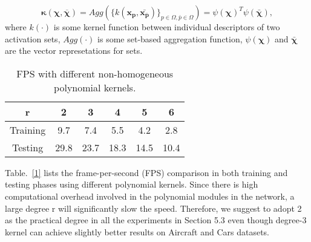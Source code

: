 \documentclass{article}
\begin{document}
\begin{equation} \label{1}
\boldsymbol{\kappa(\chi,\overline{\chi})}=Agg(\{k(\boldsymbol{x_p,\bar{x_{\overline p}}})\}_{p\in\Omega,\bar p\in\Omega})=\psi(\boldsymbol{\chi})^T\psi(\bar{\boldsymbol{\chi}}),
\end{equation}
where $k(\cdot)$ is some kernel function between individual descriptors of two activation sets, $Agg(\cdot)$ is some set-based aggregation function, $\psi(\boldsymbol{\chi})$ and $\bar{\boldsymbol{\chi}}$ are the vector represetations for sets.
\par
\begin{table}[htbp]
\centering
\begin{tabular}{|c|c|c|c|c|c|}
\hline
r & 2 & 3 & 4 & 5 & 6 \\
\hline
Training & 9.7 & 7.4 & 5.5 & 4.2 & 2.8 \\
\hline
Testing & 29.8 & 23.7 & 18.3 & 14.5 & 10.4 \\
\hline
\end{tabular}
\caption{FPS with different non-homogeneous polynomial kernels.}
\label{tab1}
\end{table}
Table.~\textcolor{red}{\ref{1}} lists the frame-per-second (FPS) comparison in both training and testing phases using different polynomial kernels. Since there is high computational overhead involved in the polynomial modules in the network, a large degree r will significantly slow the speed. Therefore, we suggest to adopt 2 as the practical degree in all the experiments in Section 5.3 even though degree-3 kernel can achieve slightly better results on Aircraft and Cars datasets.
{\small
       
       
}
\end{document}

